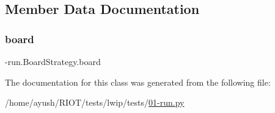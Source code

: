 \subsection{Member Data Documentation}
\mbox{\label{class01-run_1_1BoardStrategy_abf87e8d3a40c7d97f2b12934a630d9c2}} 
\subsubsection{\texorpdfstring{board}{board}}
{\footnotesize{}-\/run.\+Board\+Strategy.\+board}



The documentation for this class was generated from the following file\+:\begin{DoxyCompactItemize}
\item 
/home/ayush/\+R\+I\+O\+T/tests/lwip/tests/\hyperlink{lwip_2tests_201-run_8py}{01-\/run.\+py}\end{DoxyCompactItemize}
